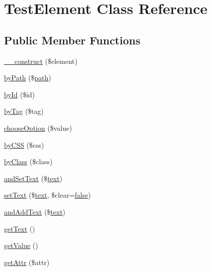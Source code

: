 \hypertarget{classTestElement}{}\section{Test\+Element Class Reference}
\label{classTestElement}
\subsection*{Public Member Functions}
\begin{DoxyCompactItemize}
\item 
\hyperlink{classTestElement_a5555f24285021a20747175e5fa686fbf}{\+\_\+\+\_\+construct} (\$element)
\item 
\hyperlink{classTestElement_ac3025f8014dade5d754d3943689a396f}{by\+Path} (\$\hyperlink{Shape_8php_a3b05eec13add53df44e232273d718ae4}{path})
\item 
\hyperlink{classTestElement_a584de1c2c8c24eb790f493102bcb1fac}{by\+Id} (\$id)
\item 
\hyperlink{classTestElement_a46f9075b924f047895d576e0af82d9c9}{by\+Tag} (\$tag)
\item 
\hyperlink{classTestElement_a56ad09c49ee8c9781b8c50ab31d08b22}{choose\+Option} (\$value)
\item 
\hyperlink{classTestElement_aaf0f757cf4dfc5925d0db204bcb252d5}{by\+C\+S\+S} (\$css)
\item 
\hyperlink{classTestElement_a5211d65c1aa197f6dc1e22e24283abb2}{by\+Class} (\$class)
\item 
\hyperlink{classTestElement_a37b4de38664b658faa86ade0d7073dd4}{and\+Set\+Text} (\$\hyperlink{Shape_8php_a37df362c2f77a0045fa8af094f432238}{text})
\item 
\hyperlink{classTestElement_ac5968c56cb813dba50a15b50946e5330}{set\+Text} (\$\hyperlink{Shape_8php_a37df362c2f77a0045fa8af094f432238}{text}, \$clear=\hyperlink{tina4_8php_aec2deb5590a84bee262c3bea206ae88f}{false})
\item 
\hyperlink{classTestElement_a7f2722947e83c9268799ab59294626bc}{and\+Add\+Text} (\$\hyperlink{Shape_8php_a37df362c2f77a0045fa8af094f432238}{text})
\item 
\hyperlink{classTestElement_a86c3a50de5a568d5ca9a75339ef1a417}{get\+Text} ()
\item 
\hyperlink{classTestElement_a1964043ed9be26b977b5ed6b4d993aaa}{get\+Value} ()
\item 
\hyperlink{classTestElement_ad9fd0dc7b25f15c78483e0710dea2d04}{get\+Attr} (\$attr)
\item 

\end{DoxyCompactItemize}
